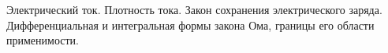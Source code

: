 \documentclass[__main__.tex]{subfiles}
\begin{document}
Электрический ток. Плотность тока. Закон сохранения электрического заряда. Дифференциальная и интегральная формы закона Ома, границы его области применимости.\\ 

\end{document}
